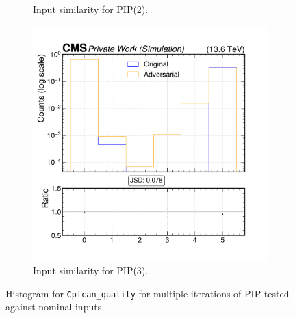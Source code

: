 \begin{figure}[h]
\begin{subfigure}[t]{0.32\textwidth}
    \caption{Input similarity for PIP(2).}
  \end{subfigure}\hfill
  \begin{subfigure}[t]{0.32\textwidth}
    \includegraphics[width=\linewidth]{media/output/features/compare/intprob_3/cmp_cpf_arr_Cpfcan_quality.pdf}
    \caption{Input similarity for PIP(3).}
  \end{subfigure}

  \caption{Histogram for \texttt{Cpfcan\_quality} for multiple iterations of PIP tested against nominal inputs.}
  \label{fig:intprob_input_Cpfcan_quality}
\end{figure}
